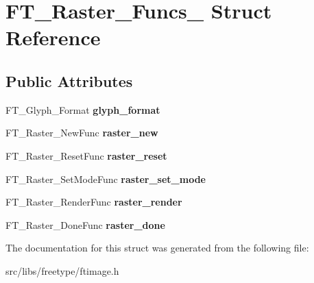 \hypertarget{struct_f_t___raster___funcs__}{
\section{FT\_\-Raster\_\-Funcs\_\- Struct Reference}
\label{struct_f_t___raster___funcs__}
}
\subsection*{Public Attributes}
\begin{DoxyCompactItemize}
\item 
\hypertarget{struct_f_t___raster___funcs___a741b43afa16f1f1b7f633cebd9f1d6a9}{
FT\_\-Glyph\_\-Format {\bfseries glyph\_\-format}}
\label{struct_f_t___raster___funcs___a741b43afa16f1f1b7f633cebd9f1d6a9}

\item 
\hypertarget{struct_f_t___raster___funcs___a31c9df9af6636df8a17a11bcd921b6a4}{
FT\_\-Raster\_\-NewFunc {\bfseries raster\_\-new}}
\label{struct_f_t___raster___funcs___a31c9df9af6636df8a17a11bcd921b6a4}

\item 
\hypertarget{struct_f_t___raster___funcs___a91e9decd6066090a5f306f33f9815d39}{
FT\_\-Raster\_\-ResetFunc {\bfseries raster\_\-reset}}
\label{struct_f_t___raster___funcs___a91e9decd6066090a5f306f33f9815d39}

\item 
\hypertarget{struct_f_t___raster___funcs___a3b37c781e54cf933cb60f57f2d45b32c}{
FT\_\-Raster\_\-SetModeFunc {\bfseries raster\_\-set\_\-mode}}
\label{struct_f_t___raster___funcs___a3b37c781e54cf933cb60f57f2d45b32c}

\item 
\hypertarget{struct_f_t___raster___funcs___a7479a3def4522ce2667d6772e7bb96a5}{
FT\_\-Raster\_\-RenderFunc {\bfseries raster\_\-render}}
\label{struct_f_t___raster___funcs___a7479a3def4522ce2667d6772e7bb96a5}

\item 
\hypertarget{struct_f_t___raster___funcs___aecfd50bb6567d4442c997467cd68c857}{
FT\_\-Raster\_\-DoneFunc {\bfseries raster\_\-done}}
\label{struct_f_t___raster___funcs___aecfd50bb6567d4442c997467cd68c857}

\end{DoxyCompactItemize}


The documentation for this struct was generated from the following file:\begin{DoxyCompactItemize}
\item 
src/libs/freetype/ftimage.h\end{DoxyCompactItemize}
